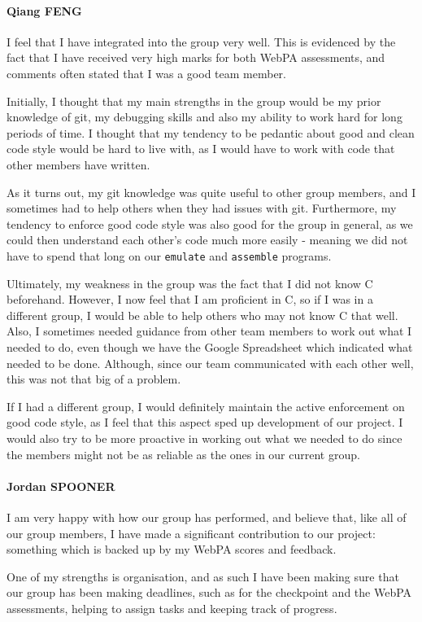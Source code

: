\documentclass[10pt]{article}
\begin{document}
\paragraph{Qiang FENG}
I feel that I have integrated into the group very well. This is evidenced by the fact that I have received very high marks for both WebPA assessments, and comments often stated that I was a good team member.

Initially, I thought that my main strengths in the group would be my prior knowledge of git, my debugging skills and also my ability to work hard for long periods of time. I thought that my tendency to be pedantic about good and clean code style would be hard to live with, as I would have to work with code that other members have written.

As it turns out, my git knowledge was quite useful to other group members, and I sometimes had to help others when they had issues with git. Furthermore, my tendency to enforce good code style was also good for the group in general, as we could then understand each other's code much more easily - meaning we did not have to spend that long on our \texttt{emulate} and \texttt{assemble} programs.

Ultimately, my weakness in the group was the fact that I did not know C beforehand. However, I now feel that I am proficient in C, so if I was in a different group, I would be able to help others who may not know C that well. Also, I sometimes needed guidance from other team members to work out what I needed to do, even though we have the Google Spreadsheet which indicated what needed to be done. Although, since our team communicated with each other well, this was not that big of a problem.

If I had a different group, I would definitely maintain the active enforcement on good code style, as I feel that this aspect sped up development of our project. I would also try to be more proactive in working out what we needed to do since the members might not be as reliable as the ones in our current group.

\paragraph{Jordan SPOONER}
I am very happy with how our group has performed, and believe that, like all of our group members, I have made a significant contribution to our project: something which is backed up by my WebPA scores and feedback.

One of my strengths is organisation, and as such I have been making sure that our group has been making deadlines, such as for the checkpoint and the WebPA assessments, helping to assign tasks and keeping track of progress.
\end{document}

